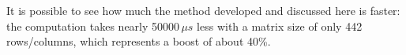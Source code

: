 
It is possible to see how much the method developed and discussed here is faster: the computation takes nearly 50000\(\,\mu{s} \) less with a matrix size of only 442 rows/columns, which represents a boost of about 40\%.